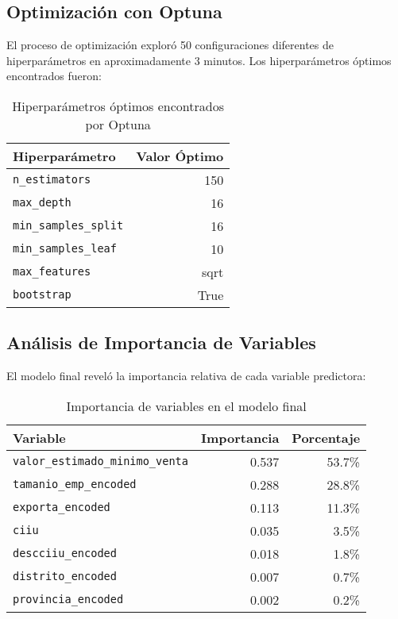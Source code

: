 \documentclass[12pt,a4paper]{article}
\begin{document}
\subsection{Optimización con Optuna}

El proceso de optimización exploró 50 configuraciones diferentes de hiperparámetros en aproximadamente 3 minutos. Los hiperparámetros óptimos encontrados fueron:

\begin{table}[H]
\centering
\caption{Hiperparámetros óptimos encontrados por Optuna}
\begin{tabular}{lr}
\toprule
\textbf{Hiperparámetro} & \textbf{Valor Óptimo} \\
\midrule
\texttt{n\_estimators} & 150 \\
\texttt{max\_depth} & 16 \\
\texttt{min\_samples\_split} & 16 \\
\texttt{min\_samples\_leaf} & 10 \\
\texttt{max\_features} & sqrt \\
\texttt{bootstrap} & True \\
\bottomrule
\end{tabular}
\label{tab:hiperparametros_optimos}
\end{table}

\subsection{Análisis de Importancia de Variables}

El modelo final reveló la importancia relativa de cada variable predictora:

\begin{table}[H]
\centering
\caption{Importancia de variables en el modelo final}
\begin{tabular}{lrr}
\toprule
\textbf{Variable} & \textbf{Importancia} & \textbf{Porcentaje} \\
\midrule
\texttt{valor\_estimado\_minimo\_venta} & 0.537 & 53.7\% \\
\texttt{tamanio\_emp\_encoded} & 0.288 & 28.8\% \\
\texttt{exporta\_encoded} & 0.113 & 11.3\% \\
\texttt{ciiu} & 0.035 & 3.5\% \\
\texttt{descciiu\_encoded} & 0.018 & 1.8\% \\
\texttt{distrito\_encoded} & 0.007 & 0.7\% \\
\texttt{provincia\_encoded} & 0.002 & 0.2\% \\
\bottomrule
\end{tabular}
\label{tab:importancia_variables}
\end{table}
\end{document}
